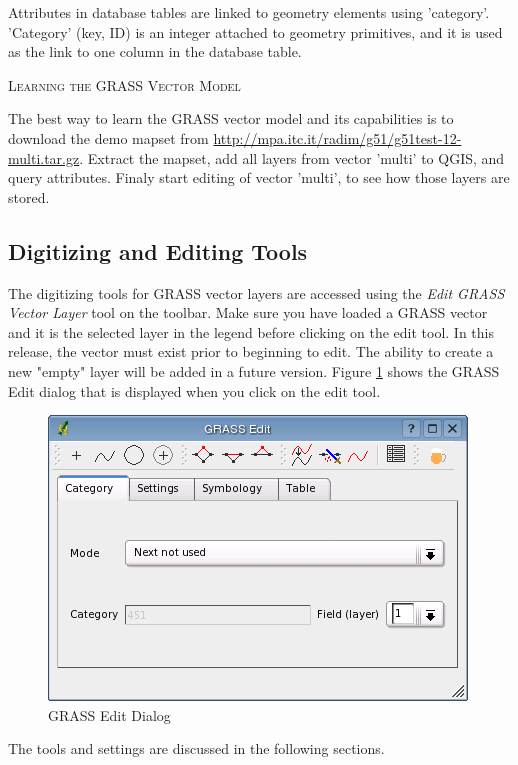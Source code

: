 \documentclass[10pt,english]{article}
\newcommand\qgistip[1]{\raggedright\small{#1}}
\begin{document}
\begin{onehalfspace}
Attributes in database tables are linked to geometry elements
using 'category'. 'Category' (key, ID) is an
integer attached to geometry primitives, and it is used as the link to one
column in the database table.\\
\begin{Tip}\caption{\textsc{Learning the GRASS Vector Model}}
\qgistip{The best way to learn the GRASS vector model and its capabilities
is to download the demo mapset from \url{http://mpa.itc.it/radim/g51/g51test-12-multi.tar.gz}.
Extract the mapset, add all layers from vector 'multi' to QGIS, and query attributes.
Finaly start editing of vector 'multi', to see how those layers are stored.
}
\end{Tip} 
\subsection{Digitizing and Editing Tools}
The digitizing tools for GRASS vector layers are accessed using the \textsl{Edit GRASS Vector Layer} tool on the toolbar. Make sure you have loaded a GRASS vector and it is the selected layer in the legend before clicking on the edit tool. In this release, the vector must exist prior to beginning to edit. The ability to create a new "empty" layer will be added in a future version. Figure \ref{fig:grass_edit} shows the GRASS Edit dialog that is displayed when you click on the edit tool. 
\begin{figure}[h]
   \begin{center}
   \caption{GRASS Edit Dialog}\label{fig:grass_edit}\smallskip
   \includegraphics[scale=.7]{qgis_user_guide_images/grassedit}
\end{center}  
\end{figure}
The tools and settings are discussed in the following sections.\\

\end{onehalfspace}
\end{document}
